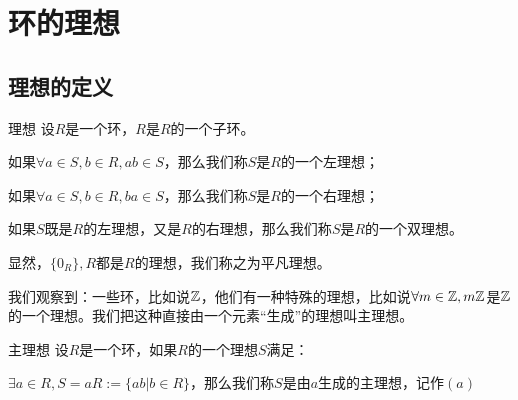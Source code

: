 \documentclass[12pt, a4paper, oneside, UTF8]{ctexbook}
\begin{document}
	\section{环的理想}
		\subsection{理想的定义}
			\begin{defn}{理想}{}
				设$R$是一个环，$R$是$R$的一个子环。

				如果$\forall a \in S,b \in R,ab \in S$，那么我们称$S$是$R$的一个左理想；

				如果$\forall a \in S,b \in R,ba \in S$，那么我们称$S$是$R$的一个右理想；

				如果$S$既是$R$的左理想，又是$R$的右理想，那么我们称$S$是$R$的一个双理想。
			\end{defn}
			显然，$\{0_R\},R$都是$R$的理想，我们称之为平凡理想。

			我们观察到：一些环，比如说$\mathbb{Z}$，他们有一种特殊的理想，比如说$\forall m \in \mathbb{Z},m\mathbb{Z}$是$\mathbb{Z}$的一个理想。我们把这种直接由一个元素“生成”的理想叫主理想。
			\begin{defn}{主理想}{}
				设$R$是一个环，如果$R$的一个理想$S$满足：

				$\exists a \in R,S=aR := \{ab | b \in R\}$，那么我们称$S$是由$a$生成的主理想，记作$(a)$
			\end{defn}
\end{document}
